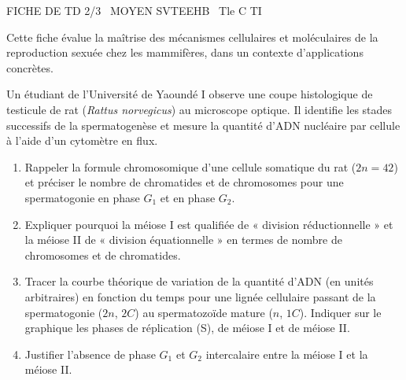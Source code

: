 \documentclass[11pt]{article}
\begin{document}
\begin{tcolorbox}[enhanced,colback=popink,colframe=popink,arc=10pt,boxrule=0pt,left=12pt,right=12pt,top=9pt,bottom=9pt]
{\color{white}\popxbold\small FICHE DE TD 2/3 \textbullet\ MOYEN \hfill SVTEEHB \textbullet\ Tle C TI\par}
\end{tcolorbox}
\vspace{4pt}
\noindent Cette fiche évalue la maîtrise des mécanismes cellulaires et moléculaires de la reproduction sexuée chez les mammifères, dans un contexte d'applications concrètes.

\begin{exercice}
Un étudiant de l'Université de Yaoundé I observe une coupe histologique de testicule de rat (\textit{Rattus norvegicus}) au microscope optique. Il identifie les stades successifs de la spermatogenèse et mesure la quantité d'ADN nucléaire par cellule à l'aide d'un cytomètre en flux.
\begin{enumerate}
    \item Rappeler la formule chromosomique d'une cellule somatique du rat ($2n=42$) et préciser le nombre de chromatides et de chromosomes pour une spermatogonie en phase $G_1$ et en phase $G_2$.
    \item Expliquer pourquoi la méiose I est qualifiée de « division réductionnelle » et la méiose II de « division équationnelle » en termes de nombre de chromosomes et de chromatides.
    \item Tracer la courbe théorique de variation de la quantité d'ADN (en unités arbitraires) en fonction du temps pour une lignée cellulaire passant de la spermatogonie ($2n$, $2C$) au spermatozoïde mature ($n$, $1C$). Indiquer sur le graphique les phases de réplication (S), de méiose I et de méiose II.
    \item Justifier l'absence de phase $G_1$ et $G_2$ intercalaire entre la méiose I et la méiose II.
\end{enumerate}
\end{exercice}
\end{document}
